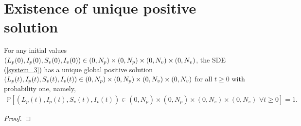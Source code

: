 \section{Existence of unique positive solution}

\begin{theorem}\label{existence-unique}
	For any initial values $(L_p(0),I_p(0),S_v(0),I_v(0))\in (0,N_p)\times(0,N_p)\\\times(0,N_v)\times(0,N_v)$, the SDE (\ref{system_3}) has a unique global positive solution $(L_p(t),I_p(t)\\,S_v(t),I_v(t))\in (0,N_p)\times(0,N_p)\times(0,N_v)\times(0,N_v)$ for all $t \geq 0$ with probability one, namely,
	\begin{align*}
		\mathbb{P}[(L_p(t),I_p(t),S_v(t),I_v(t))\in (0,N_p)\times(0,N_p)\times(0,N_v)\times(0,N_v)\,\,\forall t\geq 0]=1.
	\end{align*}
\end{theorem}
\begin{proof}
	
\end{proof}